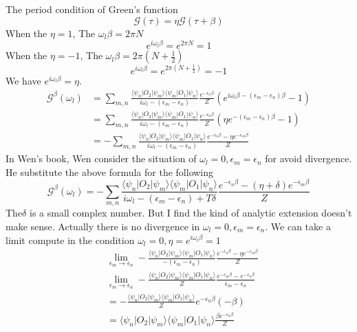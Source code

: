 \documentclass[a4paper,11pt]{article}
\newcommand{\mG}{\mathcal{G}}
\begin{document}
The period condition of Green's function
\begin{equation*}
  \mG(\tau)=\eta\mG(\tau+\beta)
\end{equation*}
When the $\eta=1$, The $\omega_l\beta=2\pi N$
\begin{equation*}
  e^{i\omega_l\beta}=e^{2\pi N}=1
\end{equation*}
When the $\eta=-1$, The $\omega_l\beta=2\pi (N+\frac{1}{2})$
\begin{equation*}
  e^{i\omega_l\beta}=e^{2\pi (N+\frac{1}{2})}=-1
\end{equation*}
We have $e^{i\omega_l\beta}=\eta$.
\begin{equation*}
  \begin{split}
     \mathcal{G}^\beta(\omega_l)&=\sum_{m,n}\frac{\langle\psi_n|O_2|\psi_m\rangle\langle\psi_m|O_1|\psi_n\rangle}{i\omega_l-(\epsilon_m-\epsilon_n)}\frac{e^{-\epsilon_n\beta}}{Z}(e^{i\omega_l\beta-(\epsilon_m-\epsilon_n)\beta}-1)\\
       &=\sum_{m,n}\frac{\langle\psi_n|O_2|\psi_m\rangle\langle\psi_m|O_1|\psi_n\rangle}{i\omega_l-(\epsilon_m-\epsilon_n)}\frac{e^{-\epsilon_n\beta}}{Z}(\eta e^{-(\epsilon_m-\epsilon_n)\beta}-1)\\
       &=-\sum_{m,n}\frac{\langle\psi_n|O_2|\psi_m\rangle\langle\psi_m|O_1|\psi_n\rangle}{i\omega_l-(\epsilon_m-\epsilon_n)}\frac{e^{-\epsilon_n\beta}-\eta e^{-\epsilon_m\beta}}{Z}
  \end{split}
\end{equation*}
In Wen's book, Wen consider the situation of $\omega_l=0, \epsilon_m=\epsilon_n$ for avoid divergence. He substitute the above formula for the following
\begin{equation*}
  \mathcal{G}^\beta(\omega_l)=-\sum_{m,n}\frac{\langle\psi_n|O_2|\psi_m\rangle\langle\psi_m|O_1|\psi_n\rangle}{i\omega_l-(\epsilon_m-\epsilon_n)+T\delta}\frac{e^{-\epsilon_n\beta}-(\eta+\delta)e^{-\epsilon_m\beta}}{Z}
\end{equation*}
The$\delta$ is a small complex number. But I find the kind of analytic extension doesn't make sense. Actually there is no divergence in $\omega_l=0, \epsilon_m=\epsilon_n$. We can take a limit compute in the condition $\omega_l=0,\eta=e^{i\omega_l\beta}=1$
\begin{equation*}
  \begin{split}
     &\lim_{\epsilon_m\to\epsilon_n}-\frac{\langle\psi_n|O_2|\psi_m\rangle\langle\psi_m|O_1|\psi_n\rangle}{-(\epsilon_m-\epsilon_n)}\frac{e^{-\epsilon_n\beta}-\eta e^{-\epsilon_m\beta}}{Z}\\
     &\lim_{\epsilon_m\to\epsilon_n}-\frac{\langle\psi_n|O_2|\psi_m\rangle\langle\psi_m|O_1|\psi_n\rangle}{Z}\frac{e^{-\epsilon_m\beta}-e^{-\epsilon_n\beta}}{\epsilon_m-\epsilon_n}\\
       &=-\frac{\langle\psi_n|O_2|\psi_m\rangle\langle\psi_m|O_1|\psi_n\rangle}{Z}e^{-\epsilon_n\beta}(-\beta)\\
       &=\langle\psi_n|O_2|\psi_m\rangle\langle\psi_m|O_1|\psi_n\rangle\frac{\beta e^{-\epsilon_n\beta}}{Z}
  \end{split}
\end{equation*}
\end{document}
